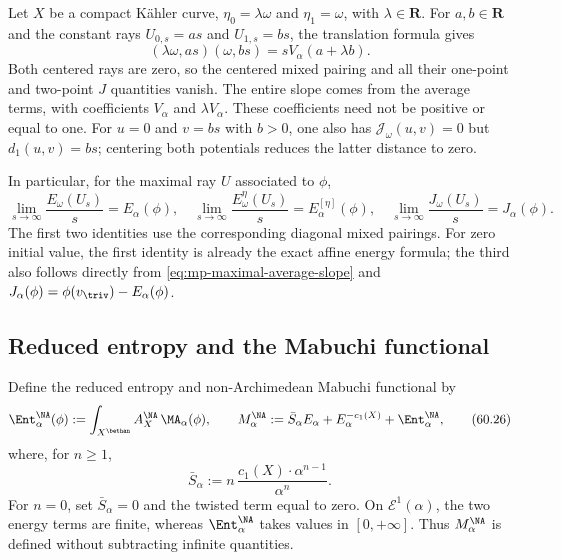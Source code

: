 \begin{example}\label{ex:mp-mixed-constant-slopes}
Let $X$ be a compact K\"ahler curve, $\eta_0=\lambda\omega$ and $\eta_1=\omega$, with $\lambda\in\mathbf R$. For $a,b\in\mathbf R$ and the constant rays $U_{0,s}=as$ and $U_{1,s}=bs$, the translation formula gives
\[
       (\lambda\omega,as)(\omega,bs)
                  =sV_\alpha(a+\lambda b).
\]
Both centered rays are zero, so the centered mixed pairing and all their one-point and two-point $J$ quantities vanish. The entire slope comes from the average terms, with coefficients $V_\alpha$ and $\lambda V_\alpha$. These coefficients need not be positive or equal to one. For $u=0$ and $v=bs$ with $b>0$, one also has $\mathcal J_\omega(u,v)=0$ but $d_1(u,v)=bs$; centering both potentials reduces the latter distance to zero.
\end{example}

In particular, for the maximal ray $U$ associated to $\phi$,
\[
 \lim_{s\to\infty}\frac{E_\omega(U_s)}s=E_\alpha(\phi),
 \quad
 \lim_{s\to\infty}\frac{E^\eta_\omega(U_s)}s
       =E^{[\eta]}_\alpha(\phi),
 \quad
 \lim_{s\to\infty}\frac{J_\omega(U_s)}s=J_\alpha(\phi).
\tag{60.25}\label{eq:mp-basic-slopes}
\]
The first two identities use the corresponding diagonal mixed pairings. For zero initial value, the first identity is already the exact affine energy formula; the third also follows directly from \eqref{eq:mp-maximal-average-slope} and $J_\alpha(\phi)=\phi(v_{\triv})-E_\alpha(\phi)$.


\subsection{Reduced entropy and the Mabuchi functional}
\label{subsec:mp-psh-reduced-entropy}

Define the reduced entropy and non-Archimedean Mabuchi functional by
{
\[
 \Ent_\alpha^{\NA}(\phi)
   :=\int_{X^{\bethan}}A_X^{\NA}\,\MA_\alpha(\phi),
\qquad
 M_\alpha^{\NA}
   :=\bar S_\alpha E_\alpha+E_\alpha^{-c_1(X)}
     +\Ent_\alpha^{\NA},
\tag{60.26}\label{eq:mp-na-mabuchi}
\]}
where, for $n\geq1$,
\[
                   \bar S_\alpha
                  :=n\,\frac{c_1(X)\cdot\alpha^{n-1}}{\alpha^n}.
\tag{60.27}\label{eq:mp-average-scalar}
\]
For $n=0$, set $\bar S_\alpha=0$ and the twisted term equal to zero. On $\mathcal E^1(\alpha)$, the two energy terms are finite, whereas $\Ent_\alpha^{\NA}$ takes values in $[0,+\infty]$. Thus $M_\alpha^{\NA}$ is defined without subtracting infinite quantities.

